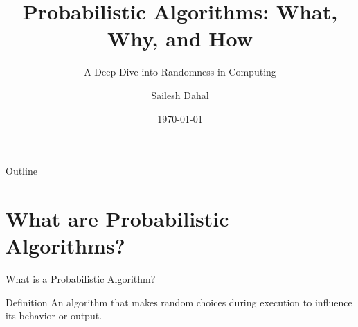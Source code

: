 \documentclass[aspectratio=169]{beamer}
\title{Probabilistic Algorithms: What, Why, and How}
\subtitle{A Deep Dive into Randomness in Computing}
\author{Sailesh Dahal}
\institute{Kathmandu University}
\date{\today}
\begin{document}
\begin{frame}[plain]
  \titlepage
\end{frame}

\begin{frame}[plain]{Outline}
  \tableofcontents
\end{frame}

\section{What are Probabilistic Algorithms?}
\begin{frame}{What is a Probabilistic Algorithm?}
  \begin{block}{Definition}
    An algorithm that makes random choices during execution to influence its behavior or output.
  \end{block}
\end{frame}
\end{document}
